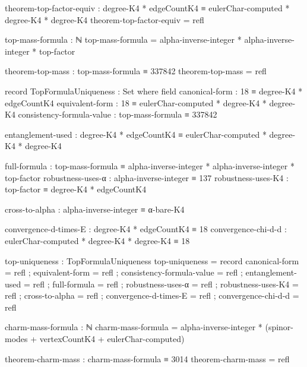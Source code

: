 \documentclass[11pt,a4paper]{book}
\begin{document}
\begin{code}
theorem-top-factor-equiv : degree-K4 * edgeCountK4 ≡ eulerChar-computed * degree-K4 * degree-K4
theorem-top-factor-equiv = refl

top-mass-formula : ℕ
top-mass-formula = alpha-inverse-integer * alpha-inverse-integer * top-factor

theorem-top-mass : top-mass-formula ≡ 337842
theorem-top-mass = refl

record TopFormulaUniqueness : Set where
  field
    canonical-form : 18 ≡ degree-K4 * edgeCountK4
    equivalent-form : 18 ≡ eulerChar-computed * degree-K4 * degree-K4
    consistency-formula-value : top-mass-formula ≡ 337842
    
    entanglement-used : degree-K4 * edgeCountK4 ≡ eulerChar-computed * degree-K4 * degree-K4
    
    full-formula : top-mass-formula ≡ alpha-inverse-integer * alpha-inverse-integer * top-factor
    robustness-uses-α : alpha-inverse-integer ≡ 137
    robustness-uses-K4 : top-factor ≡ degree-K4 * edgeCountK4
    
    cross-to-alpha : alpha-inverse-integer ≡ α-bare-K4
    
    convergence-d-times-E : degree-K4 * edgeCountK4 ≡ 18
    convergence-chi-d-d : eulerChar-computed * degree-K4 * degree-K4 ≡ 18

top-uniqueness : TopFormulaUniqueness
top-uniqueness = record
  { canonical-form = refl
  ; equivalent-form = refl
  ; consistency-formula-value = refl
  ; entanglement-used = refl
  ; full-formula = refl
  ; robustness-uses-α = refl
  ; robustness-uses-K4 = refl
  ; cross-to-alpha = refl
  ; convergence-d-times-E = refl
  ; convergence-chi-d-d = refl
  }
\end{code}

\begin{code}
charm-mass-formula : ℕ
charm-mass-formula = alpha-inverse-integer * (spinor-modes + vertexCountK4 + eulerChar-computed)

theorem-charm-mass : charm-mass-formula ≡ 3014
theorem-charm-mass = refl
\end{code}
\end{document}
